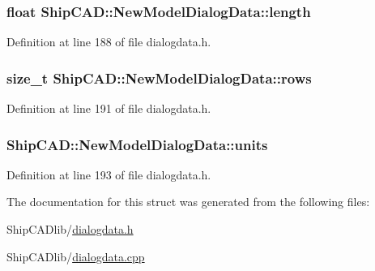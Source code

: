 \subsubsection[{\texorpdfstring{length}{length}}]{\setlength{\rightskip}{0pt plus 5cm}float Ship\+C\+A\+D\+::\+New\+Model\+Dialog\+Data\+::length}\hypertarget{structShipCAD_1_1NewModelDialogData_ad81a20ab469df5a0f65149f967415d31}{}\label{structShipCAD_1_1NewModelDialogData_ad81a20ab469df5a0f65149f967415d31}


Definition at line 188 of file dialogdata.\+h.

\subsubsection[{\texorpdfstring{rows}{rows}}]{\setlength{\rightskip}{0pt plus 5cm}size\+\_\+t Ship\+C\+A\+D\+::\+New\+Model\+Dialog\+Data\+::rows}\hypertarget{structShipCAD_1_1NewModelDialogData_aa1624f2018fd39dbbe80bc10e70efa8b}{}\label{structShipCAD_1_1NewModelDialogData_aa1624f2018fd39dbbe80bc10e70efa8b}


Definition at line 191 of file dialogdata.\+h.

\subsubsection[{\texorpdfstring{units}{units}}]{ Ship\+C\+A\+D\+::\+New\+Model\+Dialog\+Data\+::units}\hypertarget{structShipCAD_1_1NewModelDialogData_a8ff4b02ff5c3ce20c0b0d3bdade551a7}{}\label{structShipCAD_1_1NewModelDialogData_a8ff4b02ff5c3ce20c0b0d3bdade551a7}


Definition at line 193 of file dialogdata.\+h.



The documentation for this struct was generated from the following files\+:\begin{DoxyCompactItemize}
\item 
Ship\+C\+A\+Dlib/\hyperlink{dialogdata_8h}{dialogdata.\+h}\item 
Ship\+C\+A\+Dlib/\hyperlink{dialogdata_8cpp}{dialogdata.\+cpp}\end{DoxyCompactItemize}
